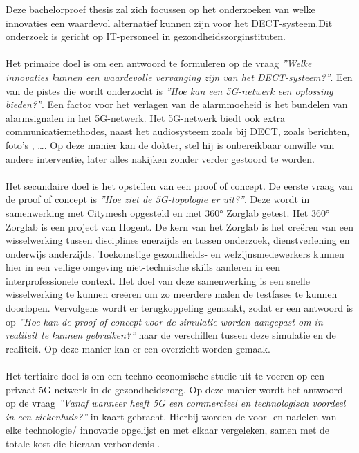 Deze bachelorproef thesis zal zich focussen op het onderzoeken van welke innovaties een waardevol alternatief kunnen zijn voor het DECT-systeem.Dit onderzoek is gericht op IT-personeel in gezondheidszorginstituten.\\\\
Het primaire doel is om een antwoord te formuleren op de vraag \textit{''Welke innovaties kunnen een waardevolle vervanging zijn van het DECT-systeem?''}. Een van de pistes die wordt onderzocht is \textit{''Hoe kan een 5G-netwerk een oplossing bieden?''}. Een factor voor het verlagen van de alarmmoeheid is het bundelen van alarmsignalen in het 5G-netwerk. Het 5G-netwerk biedt ook extra communicatiemethodes, naast het audiosysteem zoals bij DECT, zoals berichten, foto's , \dots . Op deze manier kan de dokter, stel hij is onbereikbaar omwille van andere interventie, later alles nakijken zonder verder gestoord te worden. \\\\
Het secundaire doel is het opstellen van een proof of concept. De eerste vraag van de proof of concept is \textit{''Hoe ziet de 5G-topologie er uit?''}. Deze wordt in samenwerking met Citymesh opgesteld en met 360° Zorglab getest. Het 360° Zorglab is een project van Hogent. De kern van het Zorglab is het creëren van een wisselwerking tussen disciplines enerzijds en tussen onderzoek, dienstverlening en onderwijs anderzijds. Toekomstige gezondheids- en welzijnsmedewerkers kunnen hier in een veilige omgeving niet-technische skills aanleren in een interprofessionele context. \autocite{HOGENT2024} Het doel van deze samenwerking is een snelle wisselwerking te kunnen creëren om zo meerdere malen de testfases te kunnen doorlopen. Vervolgens wordt er terugkoppeling gemaakt, zodat er een antwoord is op \textit{''Hoe kan de proof of concept voor de simulatie worden aangepast om in realiteit te kunnen gebruiken?''} naar de verschillen tussen deze simulatie en de realiteit. Op deze manier kan er een overzicht worden gemaak.\\\\
Het tertiaire doel is om een techno-economische studie uit te voeren op een privaat 5G-netwerk in de gezondheidszorg. Op deze manier wordt het antwoord op de vraag \textit{''Vanaf wanneer heeft 5G een commercieel en technologisch voordeel in een ziekenhuis?''} in kaart gebracht. Hierbij worden de voor- en nadelen van elke technologie/ innovatie opgelijst en met elkaar vergeleken, samen met de totale kost die hieraan verbondenis .



